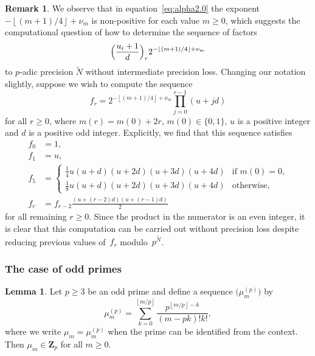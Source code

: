 \documentclass[a4paper,11pt]{article}
\numberwithin{equation}{section}
\providecommand{\floor}[1]{\left\lfloor#1\right\rfloor}   %
\newcommand{\ZZ}{\mathbf{Z}} %
\theoremstyle{definition}
\newtheorem{lem}[thm]{Lemma}
\newtheorem{rem}[thm]{Remark}
\begin{document}
\begin{rem}
We observe that in equation~\eqref{eq:alpha2.0} the exponent 
$-\floor{(m+1)/4}+\nu_m$ is non-positive for each value $m \geq 0$, 
which suggests the computational question of how to determine the 
sequence of factors 
\begin{equation*}
\Bigl(\frac{u_i+1}{d}\Bigr)_r 2^{- \floor{(m+1)/4} + \nu_m}
\end{equation*}
to $p$-adic precision $\tilde{N}$ without intermediate precision loss.
Changing our notation slightly, suppose we wish to compute the sequence
\begin{equation*}
f_r = 2^{- \floor{(m+1)/4} + \nu_m} \prod_{j=0}^{r-1} (u + j d)
\end{equation*}
for all $r \geq 0$, where $m(r) = m(0) + 2r$, $m(0) \in \{0,1\}$, 
$u$ is a positive integer and $d$ is a positive odd integer.
Explicitly, we find that this sequence satisfies 
\begin{align*}
f_0 & = 1, \\
f_1 & = u, \\
f_5 & = \begin{cases}
        \displaystyle \tfrac{1}{4} u (u + d) (u + 2d) (u + 3d) (u + 4d)
            & \text{if $m(0)=0$,} \\
        \displaystyle \tfrac{1}{8} u (u + d) (u + 2d) (u + 3d) (u + 4d)
            & \text{otherwise,}
        \end{cases} \\
f_r & = f_{r-2} \frac{(u + (r - 2)d)(u + (r - 1)d)}{2}
\end{align*}
for all remaining $r \geq 0$.  Since the product in the numerator is 
an even integer, it is clear that this computation can be carried 
out without precision loss despite reducing previous values of~$f_r$ 
modulo~$p^{\tilde{N}}$.
\end{rem}

\subsubsection{The case of odd primes}

\begin{lem} \label{lem:mup}
Let $p \geq 3$ be an odd prime and define a sequence 
$\bigl(\mu_m^{(p)}\bigr)$ by 
\begin{equation}
\mu_m^{(p)} = \sum_{k=0}^{\floor{m/p}} \frac{p^{\floor{m/p} - k}}{(m-pk)! k!}, 
\end{equation}
where we write $\mu_m = \mu_m^{(p)}$ when the prime can be identified 
from the context.  Then $\mu_m \in \ZZ_p$ for all $m \geq 0$.
\end{lem}
\end{document}

